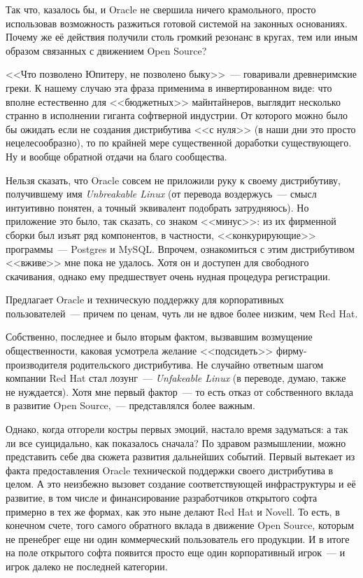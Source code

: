 Так что, казалось бы, и Oracle не свершила ничего крамольного, просто использовав возможность разжиться готовой системой на законных основаниях. Почему же её действия получили столь громкий резонанс в кругах, тем или иным образом связанных с движением Open Source?

<<Что позволено Юпитеру, не позволено быку>>~--- говаривали древнеримские греки. К нашему случаю эта фраза применима в инвертированном виде: что вполне естественно для <<бюджетных>> майнтайнеров, выглядит несколько странно в исполнении гиганта софтверной индустрии. От которого можно было бы ожидать если не создания дистрибутива <<с нуля>> (в наши дни это просто нецелесообразно), то по крайней мере существенной доработки существующего. Ну и вообще обратной отдачи на благо сообщества.

Нельзя сказать, что Oracle совсем не приложили руку к своему дистрибутиву, получившему имя 
\textit{Unbreakable Linux}
 (от перевода воздержусь~--- смысл интуитивно понятен, а точный эквивалент подобрать затрудняюсь). Но приложение это было, так сказать, со знаком <<минус>>: из их фирменной сборки был изъят ряд компонентов, в частности, <<конкурирующие>> программы~--- Postgres и MySQL. Впрочем, ознакомиться с этим дистрибутивом <<вживе>> мне пока не удалось. Хотя он и доступен для свободного скачивания, однако ему предшествует очень нудная процедура регистрации.

Предлагает Oracle и техническую поддержку для корпоративных пользователей~--- причем по ценам, чуть ли не вдвое более низким, чем Red Hat.

Собственно, последнее и было вторым фактом, вызвавшим возмущение общественности, каковая усмотрела желание <<подсидеть>> фирму-производителя родительского дистрибутива. Не случайно ответным шагом компании Red Hat стал лозунг~--- 
\textit{Unfakeable Linux}
 (в переводе, думаю, также не нуждается). Хотя мне первый фактор~--- то есть отказ от собственного вклада в развитие Open Source,~--- представлялся более важным.

Однако, когда отгорели костры первых эмоций, настало время задуматься: а так ли все суицидально, как показалось сначала? По здравом размышлении, можно представить себе два сюжета развития дальнейших событий. Первый вытекает из факта предоставления Oracle технической поддержки своего дистрибутива в целом. А это неизбежно вызовет создание соответствующей инфраструктуры и её развитие, в том числе и финансирование разработчиков открытого софта примерно в тех же формах, как это ныне делают Red Hat и Novell. То есть, в конечном счете, того самого обратного вклада в движение Open Source, которым не пренебрег еще ни один коммерческий пользователь его продукции. И в итоге на поле открытого софта появится просто еще один корпоративный игрок~--- и игрок далеко не последней категории.

